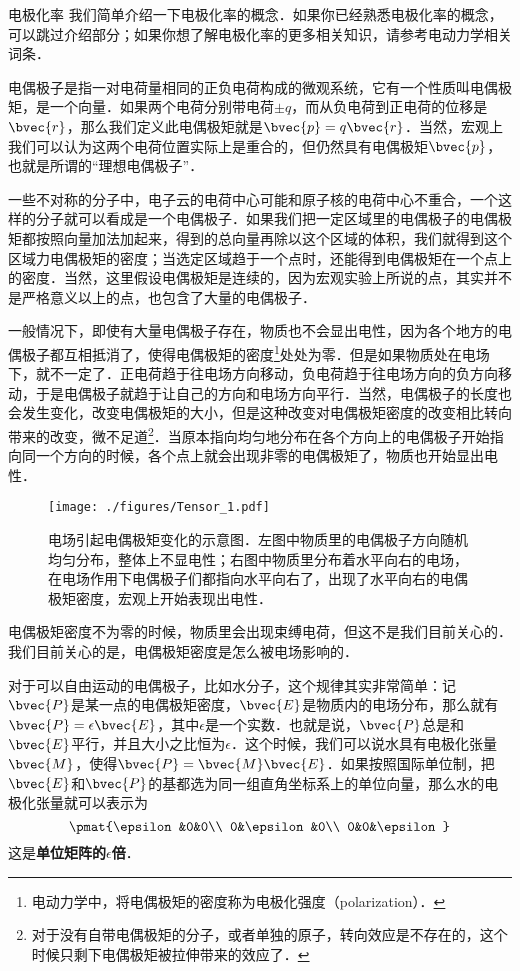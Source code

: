 \begin{example}{电极化率}
我们简单介绍一下电极化率的概念．如果你已经熟悉电极化率的概念，可以跳过介绍部分；如果你想了解电极化率的更多相关知识，请参考电动力学相关词条．

电偶极子是指一对电荷量相同的正负电荷构成的微观系统，它有一个性质叫电偶极矩，是一个向量．如果两个电荷分别带电荷$\pm q$，而从负电荷到正电荷的位移是$\bvec{r}$，那么我们定义此电偶极矩就是$\bvec{p}=q\bvec{r}$．当然，宏观上我们可以认为这两个电荷位置实际上是重合的，但仍然具有电偶极矩$\bvec{p}$，也就是所谓的“理想电偶极子”．

一些不对称的分子中，电子云的电荷中心可能和原子核的电荷中心不重合，一个这样的分子就可以看成是一个电偶极子．如果我们把一定区域里的电偶极子的电偶极矩都按照向量加法加起来，得到的总向量再除以这个区域的体积，我们就得到这个区域力电偶极矩的密度；当选定区域趋于一个点时，还能得到电偶极矩在一个点上的密度．当然，这里假设电偶极矩是连续的，因为宏观实验上所说的点，其实并不是严格意义以上的点，也包含了大量的电偶极子．

一般情况下，即使有大量电偶极子存在，物质也不会显出电性，因为各个地方的电偶极子都互相抵消了，使得电偶极矩的密度\footnote{电动力学中，将电偶极矩的密度称为电极化强度（polarization）．}处处为零．但是如果物质处在电场下，就不一定了．正电荷趋于往电场方向移动，负电荷趋于往电场方向的负方向移动，于是电偶极子就趋于让自己的方向和电场方向平行．当然，电偶极子的长度也会发生变化，改变电偶极矩的大小，但是这种改变对电偶极矩密度的改变相比转向带来的改变，微不足道\footnote{对于没有自带电偶极矩的分子，或者单独的原子，转向效应是不存在的，这个时候只剩下电偶极矩被拉伸带来的效应了．}．当原本指向均匀地分布在各个方向上的电偶极子开始指向同一个方向的时候，各个点上就会出现非零的电偶极矩了，物质也开始显出电性．

\begin{figure}[ht]
\centering
\texttt{[image: ./figures/Tensor\_1.pdf]}
\caption{电场引起电偶极矩变化的示意图．左图中物质里的电偶极子方向随机均匀分布，整体上不显电性；右图中物质里分布着水平向右的电场，在电场作用下电偶极子们都指向水平向右了，出现了水平向右的电偶极矩密度，宏观上开始表现出电性．} \label{Tensor_fig1}
\end{figure}


电偶极矩密度不为零的时候，物质里会出现束缚电荷，但这不是我们目前关心的．我们目前关心的是，电偶极矩密度是怎么被电场影响的．

对于可以自由运动的电偶极子，比如水分子，这个规律其实非常简单：记$\bvec{P}$是某一点的电偶极矩密度，$\bvec{E}$是物质内的电场分布，那么就有$\bvec{P}=\epsilon\bvec{E}$，其中$\epsilon$是一个实数．也就是说，$\bvec{P}$总是和$\bvec{E}$平行，并且大小之比恒为$\epsilon$．这个时候，我们可以说水具有电极化张量$\bvec{M}$，使得$\bvec{P}=\bvec{M}\bvec{E}$．如果按照国际单位制，把$\bvec{E}$和$\bvec{P}$的基都选为同一组直角坐标系上的单位向量，那么水的电极化张量就可以表示为
\begin{equation}
\pmat{\epsilon&0&0\\ 0&\epsilon&0\\ 0&0&\epsilon}
\end{equation}
这是\textbf{单位矩阵的$\epsilon$倍}．


\end{example}

